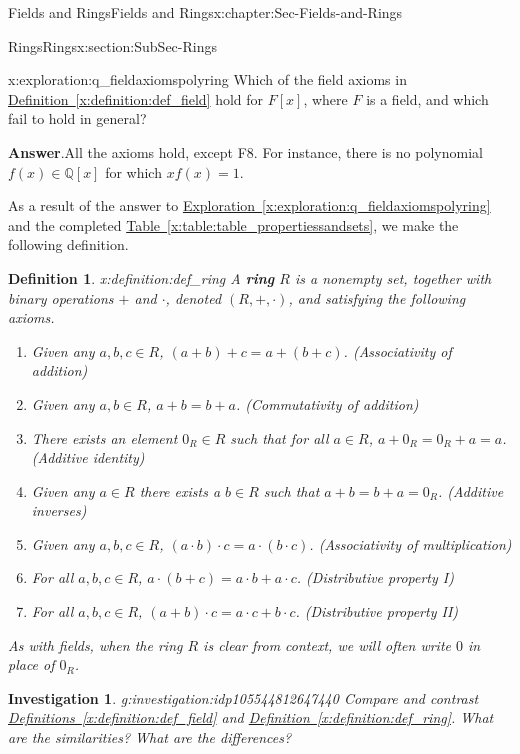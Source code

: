 \documentclass[oneside,10pt,]{book}
\newcommand{\blocktitlefont}{\relax}
\newcommand{\xreffont}{\relax}
\newcommand{\terminology}[1]{\textbf{#1}}
\numberwithin{equation}{section}
\def\Q{{\mathbb Q}}
\newtheorem{definition}[theorem]{Definition}
\newtheorem{investigation}[theorem]{Investigation}
\begin{document}
\begin{chapterptx}{Fields and Rings}{}{Fields and Rings}{}{}{x:chapter:Sec-Fields-and-Rings}
\begin{sectionptx}{Rings}{}{Rings}{}{}{x:section:SubSec-Rings}
\begin{exploration}{}{x:exploration:q_fieldaxiomspolyring}%
Which of the field axioms in \hyperref[x:definition:def_field]{Definition~{\xreffont\ref{x:definition:def_field}}} hold for \(F[x]\), where \(F\) is a field, and which fail to hold in general?%
\par\smallskip%
\noindent\textbf{\blocktitlefont Answer}.\hypertarget{g:answer:idp105544812630288}{}\quad{}All the axioms hold, except F8. For instance, there is no polynomial \(f(x)\in \Q[x]\) for which \(x f(x) = 1\).%
\end{exploration}%
As a result of the answer to \hyperref[x:exploration:q_fieldaxiomspolyring]{Exploration~{\xreffont\ref{x:exploration:q_fieldaxiomspolyring}}} and the completed \hyperref[x:table:table_propertiessandsets]{Table~{\xreffont\ref{x:table:table_propertiessandsets}}}, we make the following definition.%
\begin{definition}{}{x:definition:def_ring}%
%
A \terminology{ring} \(R\) is a nonempty set, together with binary operations \(+\) and \(\cdot\), denoted \((R,+,\cdot)\), and satisfying the following axioms.%
\begin{enumerate}
\item{}Given any \(a,b,c\in R\), \((a+b)+c = a+(b+c)\). (Associativity of addition)%
\item{}Given any \(a,b\in R\), \(a+b= b+a\). (Commutativity of addition)%
\item{}There exists an element \(0_R\in R\) such that for all \(a\in R\), \(a+0_R = 0_R + a = a\). (Additive identity)%
\item{}Given any \(a\in R\) there exists a \(b\in R\) such that \(a+b = b + a =0_R\). (Additive inverses)%
\item{}Given any \(a,b,c\in R\), \((a\cdot b)\cdot c = a\cdot (b\cdot c)\). (Associativity of multiplication)%
\item{}For all \(a,b,c\in R\), \(a\cdot (b+c) = a\cdot b + a\cdot c\). (Distributive property I)%
\item{}For all \(a,b,c\in R\), \((a+b)\cdot c = a\cdot c + b\cdot c\). (Distributive property II)%
\end{enumerate}
As with fields, when the ring \(R\) is clear from context, we will often write \(0\) in place of \(0_R\).%
\end{definition}
\begin{investigation}{}{g:investigation:idp105544812647440}%
Compare and contrast \hyperref[x:definition:def_field]{Definitions~{\xreffont\ref{x:definition:def_field}}} and \hyperref[x:definition:def_ring]{Definition~{\xreffont\ref{x:definition:def_ring}}}. What are the similarities? What are the differences?%

\end{investigation}
\end{sectionptx}
\end{chapterptx}
\end{document}
